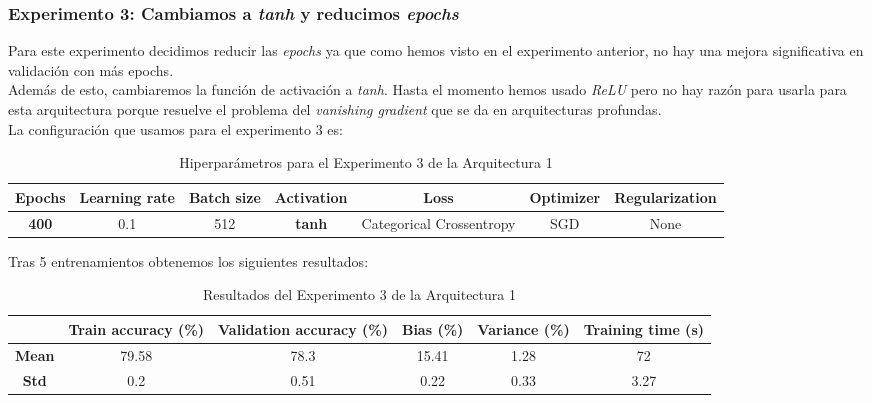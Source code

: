 \documentclass{article}
\begin{document}
		\subsubsection{Experimento 3: Cambiamos a \textit{tanh} y reducimos \textit{epochs}}
		\label{d-s-a1-e3}
			Para este experimento decidimos reducir las \textit{epochs} ya que como hemos visto en el experimento anterior, no hay una mejora significativa en validaci\'on con m\'as epochs.\\
			Adem\'as de esto, cambiaremos la funci\'on de activaci\'on a \textit{tanh}. Hasta el momento hemos usado \textit{ReLU} pero no hay raz\'on para usarla para esta arquitectura porque resuelve el problema del \textit{vanishing gradient} que se da en arquitecturas profundas.\\
			La configuraci\'on que usamos para el experimento 3 es:
			\begin{table}[!h]
				\begin{center}
					\begin{tabular}{| c | c | c | c | c | c | c |}
						\textbf{Epochs} & \textbf{Learning rate} & \textbf{Batch size} & \textbf{Activation} & \textbf{Loss} & \textbf{Optimizer} & \textbf{Regularization} \\ \hline
						\textbf{400} & 0.1 & 512 & \textbf{tanh} & Categorical Crossentropy & SGD & None
					\end{tabular}
					\caption{Hiperpar\'ametros para el Experimento 3 de la Arquitectura 1}
					\label{tab:hip-d-a1-e3}
				\end{center}
			\end{table}
			
			Tras 5 entrenamientos obtenemos los siguientes resultados:
			\begin{table}[!h]
				\begin{center}
					\begin{tabular}{ c | c | c | c | c | c |}
						\ & \textbf{Train accuracy (\%)} & \textbf{Validation accuracy (\%)} & \textbf{Bias (\%)} & \textbf{Variance (\%)} & \textbf{Training time (s)} \\ \hline
						\textbf{Mean} & 79.58 & 78.3 & 15.41 & 1.28 & 72\\ \hline
						\textbf{Std} & 0.2 & 0.51 & 0.22 & 0.33 & 3.27 \\ \hline
					\end{tabular}
					\caption{Resultados del Experimento 3 de la Arquitectura 1}
					\label{tab:res-d-a1-e3}
				\end{center}
			\end{table}
			
\end{document}
